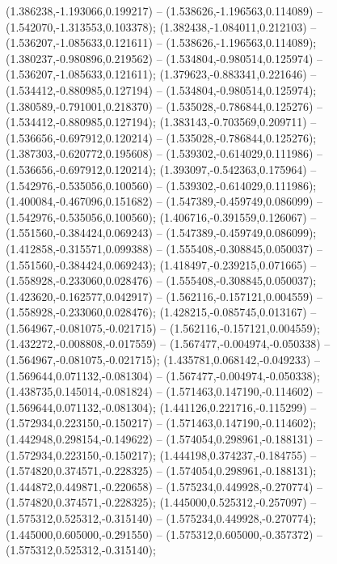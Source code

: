  (1.386238,-1.193066,0.199217) -- (1.538626,-1.196563,0.114089) -- (1.542070,-1.313553,0.103378);
 (1.382438,-1.084011,0.212103) -- (1.536207,-1.085633,0.121611) -- (1.538626,-1.196563,0.114089);
 (1.380237,-0.980896,0.219562) -- (1.534804,-0.980514,0.125974) -- (1.536207,-1.085633,0.121611);
 (1.379623,-0.883341,0.221646) -- (1.534412,-0.880985,0.127194) -- (1.534804,-0.980514,0.125974);
 (1.380589,-0.791001,0.218370) -- (1.535028,-0.786844,0.125276) -- (1.534412,-0.880985,0.127194);
 (1.383143,-0.703569,0.209711) -- (1.536656,-0.697912,0.120214) -- (1.535028,-0.786844,0.125276);
 (1.387303,-0.620772,0.195608) -- (1.539302,-0.614029,0.111986) -- (1.536656,-0.697912,0.120214);
 (1.393097,-0.542363,0.175964) -- (1.542976,-0.535056,0.100560) -- (1.539302,-0.614029,0.111986);
 (1.400084,-0.467096,0.151682) -- (1.547389,-0.459749,0.086099) -- (1.542976,-0.535056,0.100560);
 (1.406716,-0.391559,0.126067) -- (1.551560,-0.384424,0.069243) -- (1.547389,-0.459749,0.086099);
 (1.412858,-0.315571,0.099388) -- (1.555408,-0.308845,0.050037) -- (1.551560,-0.384424,0.069243);
 (1.418497,-0.239215,0.071665) -- (1.558928,-0.233060,0.028476) -- (1.555408,-0.308845,0.050037);
 (1.423620,-0.162577,0.042917) -- (1.562116,-0.157121,0.004559) -- (1.558928,-0.233060,0.028476);
 (1.428215,-0.085745,0.013167) -- (1.564967,-0.081075,-0.021715) -- (1.562116,-0.157121,0.004559);
 (1.432272,-0.008808,-0.017559) -- (1.567477,-0.004974,-0.050338) -- (1.564967,-0.081075,-0.021715);
 (1.435781,0.068142,-0.049233) -- (1.569644,0.071132,-0.081304) -- (1.567477,-0.004974,-0.050338);
 (1.438735,0.145014,-0.081824) -- (1.571463,0.147190,-0.114602) -- (1.569644,0.071132,-0.081304);
 (1.441126,0.221716,-0.115299) -- (1.572934,0.223150,-0.150217) -- (1.571463,0.147190,-0.114602);
 (1.442948,0.298154,-0.149622) -- (1.574054,0.298961,-0.188131) -- (1.572934,0.223150,-0.150217);
 (1.444198,0.374237,-0.184755) -- (1.574820,0.374571,-0.228325) -- (1.574054,0.298961,-0.188131);
 (1.444872,0.449871,-0.220658) -- (1.575234,0.449928,-0.270774) -- (1.574820,0.374571,-0.228325);
 (1.445000,0.525312,-0.257097) -- (1.575312,0.525312,-0.315140) -- (1.575234,0.449928,-0.270774);
 (1.445000,0.605000,-0.291550) -- (1.575312,0.605000,-0.357372) -- (1.575312,0.525312,-0.315140);
